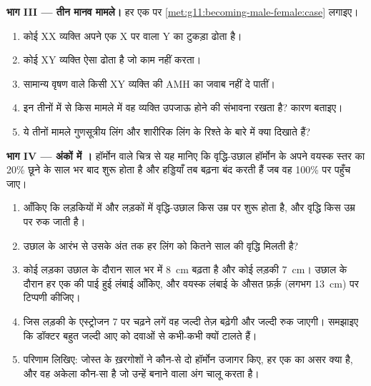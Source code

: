 \begin{problem}
\medskip
\noindent\textbf{भाग III --- तीन मानव मामले।}
हर एक पर \cref{met:g11:becoming-male-female:case} लगाइए।
\begin{enumerate}[resume]
  \item कोई XX व्यक्ति अपने एक X  पर  वाला Y का टुकड़ा ढोता
        है।
  \item कोई XY व्यक्ति ऐसा  ढोता है जो काम नहीं करता।
  \item सामान्य वृषण वाले किसी XY व्यक्ति की  AMH का जवाब नहीं दे
        पातीं।
  \item इन तीनों में से किस मामले में वह व्यक्ति उपजाऊ होने की संभावना
        रखता है? कारण बताइए।
  \item ये तीनों मामले गुणसूत्रीय लिंग और शारीरिक लिंग के रिश्ते के बारे
        में क्या दिखाते हैं?
\end{enumerate}

\medskip
\noindent\textbf{भाग IV --- अंकों में ।}
हॉर्मोन वाले चित्र से यह मानिए कि वृद्धि-उछाल हॉर्मोन के अपने वयस्क स्तर
का 20\% छूने के साल भर बाद शुरू होता है और हड्डियाँ तब बढ़ना बंद करती हैं
जब वह 100\% पर पहुँच जाए।
\begin{enumerate}[resume]
  \item आँकिए कि लड़कियों में और लड़कों में वृद्धि-उछाल किस उम्र पर शुरू
        होता है, और वृद्धि किस उम्र पर रुक जाती है।
  \item उछाल के आरंभ से उसके अंत तक हर लिंग को कितने साल की वृद्धि मिलती
        है?
  \item कोई लड़का उछाल के दौरान साल भर में \qty{8}{cm} बढ़ता है और कोई
        लड़की \qty{7}{cm}। उछाल के दौरान हर एक की पाई हुई लंबाई आँकिए, और
        वयस्क लंबाई के औसत फ़र्क़ (लगभग \qty{13}{cm}) पर टिप्पणी कीजिए।
  \item जिस लड़की के एस्ट्रोजन 7 पर चढ़ने लगें वह जल्दी तेज़ बढ़ेगी और
        जल्दी रुक जाएगी। समझाइए कि डॉक्टर बहुत जल्दी आए  को दवाओं
        से कभी-कभी क्यों टालते हैं।
  \item परिणाम लिखिए: जोस्त के ख़रगोशों ने कौन-से दो हॉर्मोन उजागर किए,
        हर एक का असर क्या है, और वह अकेला  कौन-सा है जो उन्हें बनाने
        वाला अंग चालू करता है।
\end{enumerate}
\end{problem}
